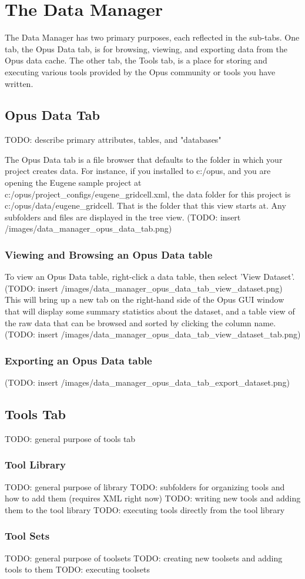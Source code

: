 \chapter{The Data Manager}
The Data Manager has two primary purposes, each reflected in the sub-tabs.  One tab, the Opus Data tab, is for browsing, viewing, and exporting data from the Opus data cache.  The other tab, the Tools tab, is a place for storing and executing various tools provided by the Opus community or tools you have written.

\section{Opus Data Tab}
TODO: describe primary attributes, tables, and "databases"

The Opus Data tab is a file browser that defaults to the folder in which your project creates data.  For instance, if you installed to c:/opus, and you are opening the Eugene sample project at c:/opus/project_configs/eugene_gridcell.xml, the data folder for this project is c:/opus/data/eugene_gridcell.  That is the folder that this view starts at.  Any subfolders and files are displayed in the tree view. (TODO: insert /images/data_manager_opus_data_tab.png)

\subsection{Viewing and Browsing an Opus Data table}
To view an Opus Data table, right-click a data table, then select 'View Dataset'.  (TODO: insert /images/data_manager_opus_data_tab_view_dataset.png) This will bring up a new tab on the right-hand side of the Opus GUI window that will display some summary statistics about the dataset, and a table view of the raw data that can be browsed and sorted by clicking the column name. (TODO: insert /images/data_manager_opus_data_tab_view_dataset_tab.png)

\subsection{Exporting an Opus Data table}
(TODO: insert /images/data_manager_opus_data_tab_export_dataset.png)

\section{Tools Tab}
TODO: general purpose of tools tab

\subsection{Tool Library}
TODO: general purpose of library
TODO: subfolders for organizing tools and how to add them (requires XML right now)
TODO: writing new tools and adding them to the tool library
TODO: executing tools directly from the tool library

\subsection{Tool Sets}
TODO: general purpose of toolsets
TODO: creating new toolsets and adding tools to them
TODO: executing toolsets